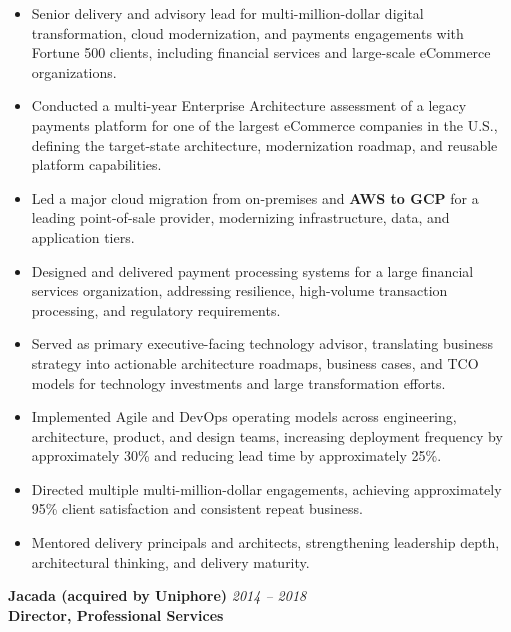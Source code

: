 \documentclass[11pt]{article}
\begin{document}
\begin{itemize}
  \item Senior delivery and advisory lead for multi-million-dollar digital transformation, cloud modernization, and payments engagements with Fortune 500 clients, including financial services and large-scale eCommerce organizations.
  \item Conducted a multi-year Enterprise Architecture assessment of a legacy payments platform for one of the largest eCommerce companies in the U.S., defining the target-state architecture, modernization roadmap, and reusable platform capabilities.
  \item Led a major cloud migration from on-premises and \textbf{AWS to GCP} for a leading point-of-sale provider, modernizing infrastructure, data, and application tiers.
  \item Designed and delivered payment processing systems for a large financial services organization, addressing resilience, high-volume transaction processing, and regulatory requirements.
  \item Served as primary executive-facing technology advisor, translating business strategy into actionable architecture roadmaps, business cases, and TCO models for technology investments and large transformation efforts.
  \item Implemented Agile and DevOps operating models across engineering, architecture, product, and design teams, increasing deployment frequency by approximately 30\% and reducing lead time by approximately 25\%.
  \item Directed multiple multi-million-dollar engagements, achieving approximately 95\% client satisfaction and consistent repeat business.
  \item Mentored delivery principals and architects, strengthening leadership depth, architectural thinking, and delivery maturity.
\end{itemize}

\vspace{6pt}

\textbf{Jacada (acquired by Uniphore)} \hfill \textit{2014 -- 2018} \\
\textbf{Director, Professional Services}
\end{document}
